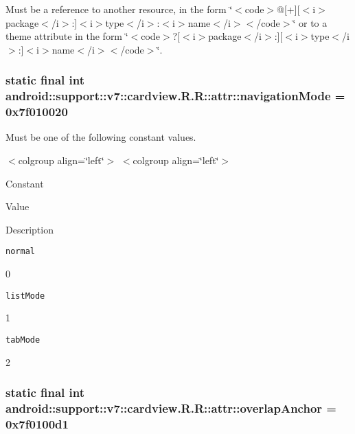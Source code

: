 Must be a reference to another resource, in the form \char`\"{}$<$code$>$@\mbox{[}+\mbox{]}\mbox{[}$<$i$>$package$<$/i$>$:\mbox{]}$<$i$>$type$<$/i$>$:$<$i$>$name$<$/i$>$$<$/code$>$\char`\"{} or to a theme attribute in the form \char`\"{}$<$code$>$?\mbox{[}$<$i$>$package$<$/i$>$:\mbox{]}\mbox{[}$<$i$>$type$<$/i$>$:\mbox{]}$<$i$>$name$<$/i$>$$<$/code$>$\char`\"{}. \hypertarget{classandroid_1_1support_1_1v7_1_1cardview_1_1_r_1_1attr_b63dd8cb50d2b84468354d26d90088c3}{
\subsubsection[{navigationMode}]{\setlength{\rightskip}{0pt plus 5cm}static final int android::support::v7::cardview.R.R::attr::navigationMode = 0x7f010020}}
\label{classandroid_1_1support_1_1v7_1_1cardview_1_1_r_1_1attr_b63dd8cb50d2b84468354d26d90088c3}


Must be one of the following constant values. \begin{TabularC}{0}
\hline
\end{TabularC}
$<$colgroup align=\char`\"{}left\char`\"{}$>$ $<$colgroup align=\char`\"{}left\char`\"{}$>$ 

Constant

Value

Description 

{\tt normal}

0

{\tt listMode}

1

{\tt tabMode}

2\hypertarget{classandroid_1_1support_1_1v7_1_1cardview_1_1_r_1_1attr_abe7f509bb92d3438a2a9277f22c7ed5}{
\subsubsection[{overlapAnchor}]{\setlength{\rightskip}{0pt plus 5cm}static final int android::support::v7::cardview.R.R::attr::overlapAnchor = 0x7f0100d1}}
\label{classandroid_1_1support_1_1v7_1_1cardview_1_1_r_1_1attr_abe7f509bb92d3438a2a9277f22c7ed5}


